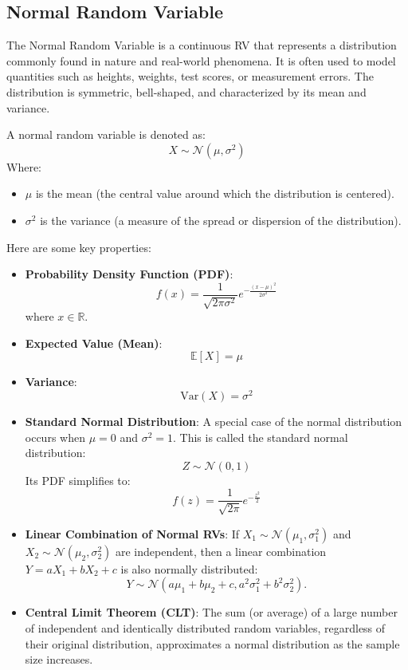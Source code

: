 \documentclass[a4paper]{article}
\begin{document}
\subsection{Normal Random Variable}
The Normal Random Variable is a continuous RV that represents a distribution commonly found in nature and real-world phenomena. It is often used to model quantities such as heights, weights, test scores, or measurement errors. The distribution is symmetric, bell-shaped, and characterized by its mean and variance.

A normal random variable is denoted as:
\[
X \sim \mathcal{N}(\mu, \sigma^2)
\]
Where:
\begin{itemize}[label=$\circ$, itemsep=-0.2cm]
    \item \(\mu\) is the mean (the central value around which the distribution is centered).
    \item  \(\sigma^2\) is the variance (a measure of the spread or dispersion of the distribution).
\end{itemize}

Here are some key properties:
\begin{itemize}
    \item \textbf{Probability Density Function (PDF)}:
    \[
    f(x) = \frac{1}{\sqrt{2\pi\sigma^2}} e^{-\frac{(x - \mu)^2}{2\sigma^2}}
    \]
    where \(x \in \mathbb{R}\).
    
    \item \textbf{Expected Value (Mean)}:
    \[
    \mathbb{E}[X] = \mu
    \]

    \item \textbf{Variance}:
    \[
    \text{Var}(X) = \sigma^2
    \]

    \item \textbf{Standard Normal Distribution}: 
    A special case of the normal distribution occurs when \(\mu = 0\) and \(\sigma^2 = 1\). This is called the standard normal distribution:
    \[
    Z \sim \mathcal{N}(0, 1)
    \]
    Its PDF simplifies to:
    \[
    f(z) = \frac{1}{\sqrt{2\pi}} e^{-\frac{z^2}{2}}
    \]

    \item \textbf{Linear Combination of Normal RVs}: 
    If \(X_1 \sim \mathcal{N}(\mu_1, \sigma_1^2)\) and \(X_2 \sim \mathcal{N}(\mu_2, \sigma_2^2)\) are independent, then a linear combination \(Y = aX_1 + bX_2 + c\) is also normally distributed:
    \[
    Y \sim \mathcal{N}(a\mu_1 + b\mu_2 + c, a^2\sigma_1^2 + b^2\sigma_2^2).
    \]

    \item \textbf{Central Limit Theorem (CLT)}:
    The sum (or average) of a large number of independent and identically distributed random variables, regardless of their original distribution, approximates a normal distribution as the sample size increases.

\end{itemize}
\end{document}
